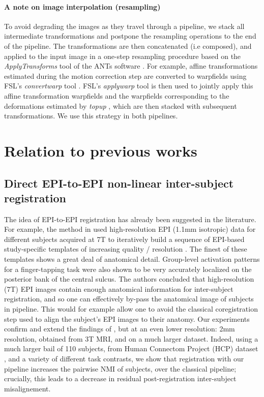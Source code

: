 \paragraph{A note on image interpolation (resampling)}
To avoid degrading the images as they travel through a pipeline, we
stack all intermediate transformations and postpone the resampling
operations to the end of the pipeline. The transformations are then
concatenated (i.e composed), and applied to the input image in a
one-step resampling procedure based on the \textit{ApplyTransforms}
tool of the ANTs software \citep{avants2008,avants2009advanced}. For
example,  affine transformations estimated during the
motion correction step are converted to warpfields using FSL's
\textit{convertwarp} tool \citep{smith2004}. FSL's \textit{applywarp}
tool \citep{smith2004} is then used to jointly apply this affine
transformation warpfields and the warpfields corresponding to the
deformations estimated by \textit{topup} \citep{smith2004}, which
are then stacked with subsequent transformations. We use this strategy in both pipelines.

\section{Relation to previous  works}
\subsection{Direct EPI-to-EPI non-linear inter-subject  registration}
The idea of EPI-to-EPI registration has already been suggested in the
literature. For example, the method in \citep{grabner2014} used
high-resolution EPI (1.1mm isotropic) data for different subjects
acquired at 7T to iteratively build a sequence of EPI-based
study-specific templates of increasing quality / resolution
\citep{pmid17354756}. The finest of these templates shows a great deal
of anatomical detail. Group-level activation patterns for a
finger-tapping task were also shown to be very accurately localized on
the posterior bank of the central sulcus. The authors concluded that
high-resolution (7T) EPI images contain enough anatomical information
for inter-subject registration, and so one can effectively by-pass the
anatomical image of subjects in pipeline. This would for example allow
one to avoid the classical coregistration step used to align the
subject's EPI images to their anatomy.  Our experiments confirm and
extend the findings of \citep{grabner2014}, but at an even lower
resolution: 2mm resolution, obtained from 3T MRI, and on a much larger
dataset. Indeed, using a much larger bail of 110 subjects, from Human
Connectom Project (HCP) dataset \citep{VanEssen20122222}, and a variety
of different task contrasts, we show that registration with our
pipeline increases the pairwise NMI of subjects, over the classical
pipeline; crucially, this leads to a decrease in residual
post-registration inter-subject misalignement.

